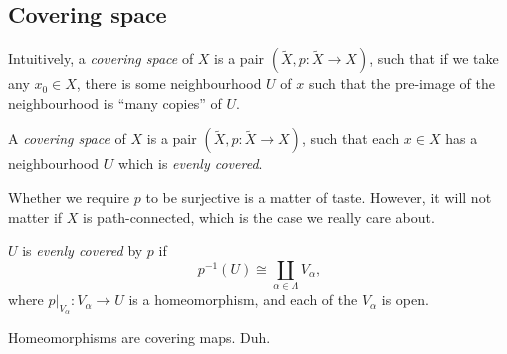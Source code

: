 \documentclass[a4paper]{article}
\begin{document}
\subsection{Covering space}
Intuitively, a \emph{covering space} of $X$ is a pair $(\tilde{X}, p: \tilde{X} \to X)$, such that if we take any $x_0 \in X$, there is some neighbourhood $U$ of $x$ such that the pre-image of the neighbourhood is ``many copies'' of $U$.
\begin{center}
\end{center}

\begin{defi}
  A \emph{covering space} of $X$ is a pair $(\tilde{X}, p: \tilde{X} \to X)$, such that each $x\in X$ has a neighbourhood $U$ which is \emph{evenly covered}.
\end{defi}
Whether we require $p$ to be surjective is a matter of taste. However, it will not matter if $X$ is path-connected, which is the case we really care about.

\begin{defi}
  $U$ is \emph{evenly covered} by $p$ if
  \[
    p^{-1}(U) \cong \coprod_{\alpha \in \Lambda}V_\alpha,
  \]
  where $p|_{V_\alpha}: V_\alpha \to U$ is a homeomorphism, and each of the $V_\alpha$ is open.
\end{defi}

\begin{eg}
  Homeomorphisms are covering maps. Duh.
\end{eg}
\end{document}
